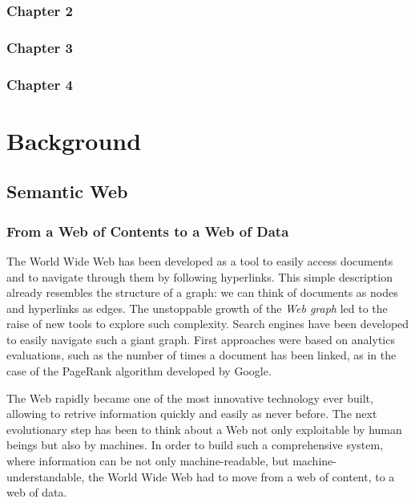 \documentclass[%
    corpo=13.5pt,
    twoside,
    oldstyle,
    tipotesi=magistrale,
    greek,
    evenboxes
]{toptesi}
\begin{document}
\subsection{Chapter 2}

\subsection{Chapter 3}

\subsection{Chapter 4}



\chapter{Background}

\section{Semantic Web}

\subsection{From a Web of Contents to a Web of Data}

The World Wide Web has been developed as a tool to easily access
documents and to navigate through them by following hyperlinks.
This simple description already resembles the structure of a graph: we can
think of documents as nodes and hyperlinks as edges. The unstoppable growth
of the \emph{Web graph} led to the raise of new tools to explore such
complexity. Search engines have been developed to easily navigate such a
giant graph. First approaches were based on analytics evaluations,
such as the number of times a document has been linked, as in the case of the
PageRank \cite{page1999} algorithm developed by Google.
\newline

The Web rapidly became one of the most innovative technology ever built,
allowing to retrive information quickly and easily as never before.
The next evolutionary step has been to think about a Web not only exploitable by
human beings but also by machines. In order to build such a comprehensive
system, where information can be not only machine-readable, but
machine-understandable, the World Wide Web had to move from a web of content, to
a web of data.
\newline
\end{document}
